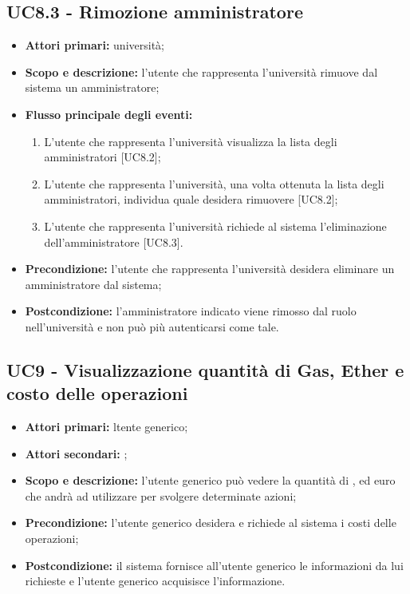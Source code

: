 \documentclass[AnalisiDeiRequisiti.tex]{subfiles}
\begin{document}
\subsection{UC8.3 - Rimozione amministratore}
\begin{itemize}
	\item \textbf{Attori primari:} università;
	\item \textbf{Scopo e descrizione:} l'utente che rappresenta l'università rimuove dal sistema un amministratore;
	\item \textbf{Flusso principale degli eventi:}
	\begin{enumerate}
		\item L'utente che rappresenta l'università  visualizza la lista degli amministratori [UC8.2];
		\item L'utente che rappresenta l'università, una volta ottenuta la lista degli amministratori, individua quale desidera rimuovere [UC8.2];
		\item L'utente che rappresenta l'università richiede al sistema l'eliminazione dell'amministratore [UC8.3].
	\end{enumerate}
	\item \textbf{Precondizione:} l'utente che rappresenta l'università desidera eliminare un amministratore dal sistema;
	\item \textbf{Postcondizione:} l'amministratore indicato viene rimosso dal ruolo nell'università e non può più autenticarsi come tale.
\end{itemize}

\subsection{UC9 - Visualizzazione quantità di Gas, Ether e costo delle operazioni}
\begin{itemize}
	\item \textbf{Attori primari:} ltente generico;
	\item \textbf{Attori secondari:} ;
	\item \textbf{Scopo e descrizione:} l'utente generico può vedere la quantità di ,  ed euro che andrà ad utilizzare per svolgere determinate azioni;
	\item \textbf{Precondizione:} l'utente generico desidera e richiede al sistema i costi delle operazioni;
	\item \textbf{Postcondizione:} il sistema fornisce all'utente generico le informazioni da lui richieste e l'utente generico acquisisce l'informazione.
\end{itemize}
\end{document}

